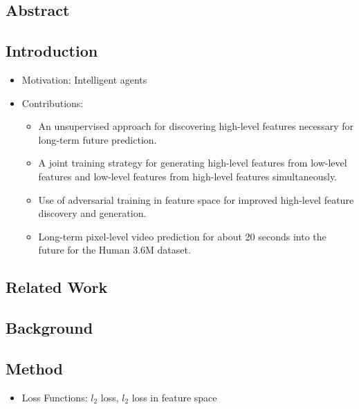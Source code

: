\documentclass{article}
\begin{document}
    \subsection*{Abstract}

    \subsection{Introduction}\label{subsec:Hierarchical_Long_term_Video_Prediction_without_Supervision:introduction}
    \begin{itemize}
        \item Motivation: Intelligent agents
        \item Contributions:
        \begin{itemize}
            \item An unsupervised approach for discovering high-level features necessary for long-term future prediction.
            \item A joint training strategy for generating high-level features from low-level features and low-level features from high-level features simultaneously.
            \item Use of adversarial training in feature space for improved high-level feature discovery and generation.
            \item Long-term pixel-level video prediction for about 20 seconds into the future for the Human 3.6M dataset.
        \end{itemize}
    \end{itemize}

    \subsection{Related Work}\label{subsec:Hierarchical_Long_term_Video_Prediction_without_Supervision:related-work}

    \subsection{Background}\label{subsec:Hierarchical_Long_term_Video_Prediction_without_Supervision:background}

    \subsection{Method}\label{subsec:Hierarchical_Long_term_Video_Prediction_without_Supervision:method}
    \begin{itemize}
        \item Loss Functions: $l_2$ loss, $l_2$ loss in feature space
    \end{itemize}
\end{document}
